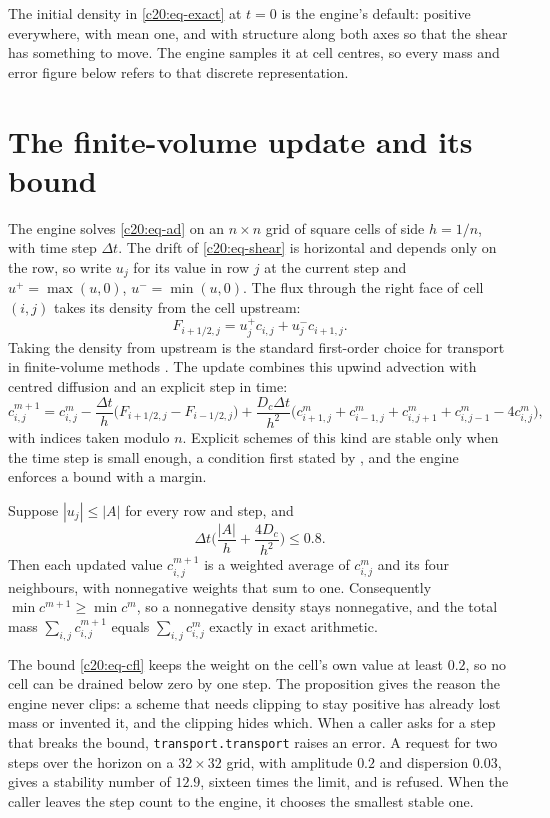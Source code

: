 The initial density in \eqref{c20:eq-exact} at $t=0$ is the engine's default: positive everywhere, with
mean one, and with structure along both axes so that the shear has something to move. The
engine samples it at cell centres, so every mass and error figure below refers to that discrete
representation.

\section{The finite-volume update and its bound}

The engine solves \eqref{c20:eq-ad} on an $n\times n$ grid of square cells of side $h=1/n$, with time step $\Delta t$.
The drift of \eqref{c20:eq-shear} is horizontal and depends only on the row, so write $u_j$ for its value in row
$j$ at the current step and $u^+=\max(u,0)$, $u^-=\min(u,0)$. The flux through the right face of
cell $(i,j)$ takes its density from the cell upstream:
\[F_{i+1/2,j}=u_j^+c_{i,j}+u_j^-c_{i+1,j}.\]
Taking the density from upstream is the standard first-order choice for transport in finite-volume methods \citep{leveque2002}. The update combines this upwind advection with centred
diffusion and an explicit step in time:
\begin{equation}\label{c20:eq-update}
c^{m+1}_{i,j}=c^m_{i,j}-\frac{\Delta t}{h}\big(F_{i+1/2,j}-F_{i-1/2,j}\big)+\frac{D_c\Delta t}{h^2}\big(c^m_{i+1,j}+c^m_{i-1,j}+c^m_{i,j+1}+c^m_{i,j-1}-4c^m_{i,j}\big),
\end{equation}
with indices taken modulo $n$. Explicit schemes of this kind are stable only when the time
step is small enough, a condition first stated by \citet{courant1928}, and the engine enforces
a bound with a margin.

\begin{proposition}\label{c20:prop-stable}
Suppose $|u_j|\le|A|$ for every row and step, and
\begin{equation}\label{c20:eq-cfl}
\Delta t\Big(\frac{|A|}{h}+\frac{4D_c}{h^2}\Big)\le0.8.
\end{equation}
Then each updated value $c^{m+1}_{i,j}$ is a weighted average of $c^m_{i,j}$ and its four neighbours, with nonnegative weights that sum to one. Consequently $\min c^{m+1}\ge\min c^m$, so a nonnegative density stays
nonnegative, and the total mass $\sum_{i,j}c^{m+1}_{i,j}$ equals $\sum_{i,j}c^m_{i,j}$ exactly in exact arithmetic.
\end{proposition}

The bound \eqref{c20:eq-cfl} keeps the weight on the cell's own value at least $0.2$, so no cell can be
drained below zero by one step. The proposition gives the reason the engine never clips: a
scheme that needs clipping to stay positive has already lost mass or invented it, and the clipping hides which. When a caller asks for a step that breaks the bound, \texttt{transport.transport}
raises an error. A request for two steps over the horizon on a $32\times32$
grid, with amplitude $0.2$ and dispersion $0.03$, gives a stability number of $12.9$, sixteen times
the limit, and is refused. When the caller leaves the step count to the engine, it chooses
the smallest stable one.

